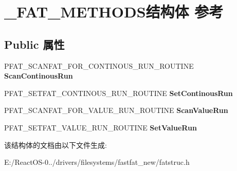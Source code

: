 \hypertarget{struct___f_a_t___m_e_t_h_o_d_s}{}\section{\+\_\+\+F\+A\+T\+\_\+\+M\+E\+T\+H\+O\+D\+S结构体 参考}
\label{struct___f_a_t___m_e_t_h_o_d_s}
\subsection*{Public 属性}
\begin{DoxyCompactItemize}
\item 
\mbox{\label{struct___f_a_t___m_e_t_h_o_d_s_ad05ea13fdd69196e904b61bd63bf0272}} 
P\+F\+A\+T\+\_\+\+S\+C\+A\+N\+F\+A\+T\+\_\+\+F\+O\+R\+\_\+\+C\+O\+N\+T\+I\+N\+O\+U\+S\+\_\+\+R\+U\+N\+\_\+\+R\+O\+U\+T\+I\+NE {\bfseries Scan\+Continous\+Run}
\item 
\mbox{\label{struct___f_a_t___m_e_t_h_o_d_s_aff8f46495c7ecd515208b3358d5503fb}} 
P\+F\+A\+T\+\_\+\+S\+E\+T\+F\+A\+T\+\_\+\+C\+O\+N\+T\+I\+N\+O\+U\+S\+\_\+\+R\+U\+N\+\_\+\+R\+O\+U\+T\+I\+NE {\bfseries Set\+Continous\+Run}
\item 
\mbox{\label{struct___f_a_t___m_e_t_h_o_d_s_a8268e95533146fe935c7b682744eb53f}} 
P\+F\+A\+T\+\_\+\+S\+C\+A\+N\+F\+A\+T\+\_\+\+F\+O\+R\+\_\+\+V\+A\+L\+U\+E\+\_\+\+R\+U\+N\+\_\+\+R\+O\+U\+T\+I\+NE {\bfseries Scan\+Value\+Run}
\item 
\mbox{\label{struct___f_a_t___m_e_t_h_o_d_s_a55c60f727da51f297de9a1c8ef9399a5}} 
P\+F\+A\+T\+\_\+\+S\+E\+T\+F\+A\+T\+\_\+\+V\+A\+L\+U\+E\+\_\+\+R\+U\+N\+\_\+\+R\+O\+U\+T\+I\+NE {\bfseries Set\+Value\+Run}
\end{DoxyCompactItemize}


该结构体的文档由以下文件生成\+:\begin{DoxyCompactItemize}
\item 
E\+:/\+React\+O\+S-\/0../drivers/filesystems/fastfat\+\_\+new/fatstruc.\+h\end{DoxyCompactItemize}
